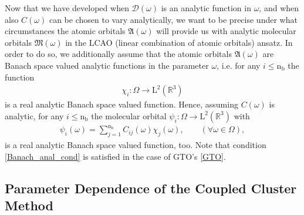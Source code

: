 \documentclass[reqno]{amsart}
\begin{document}
\newline
Now that we have developed when $\mathscr{D}(\omega)$ is an analytic function in $\omega$, and when also $C(\omega)$ can be chosen to vary analytically, we want to be precise under what circumstances the atomic orbitals $\mathfrak{A}(\omega)$ will provide us with analytic molecular orbitals $\mathfrak{M}(\omega)$ in the LCAO (linear combination of atomic orbitals) ansatz. In order to do so, we additionally assume that the atomic orbitals $\mathfrak{A}(\omega)$ are Banach space valued analytic functions in the parameter $\omega$, i.e. for any $i\le \text{n}_\text{b}$ the function
\begin{align}\label{Banach_anal_cond}
    \chi_i:\Omega\longrightarrow \mathrm{L}^2(\mathbb{R}^3)
\end{align}
is a real analytic Banach space valued function. Hence, assuming $C(\omega)$ is analytic, for any $i\le \text{n}_\text{b}$ the molecular orbital $\psi_i:\Omega\longrightarrow\mathrm{L}^2(\mathbb{R}^3)$ with
\begin{align}
    \psi_i(\omega)=\sum_{j=1}^{\text{n}_\text{b}}C_{ij}(\omega)\chi_j(\omega),\qquad (\forall \omega \in \Omega),
\end{align}
is a real analytic Banach space valued function, too. Note that condition \eqref{Banach_anal_cond} is satisfied in the case of GTO's \eqref{GTO}.

\subsection{Parameter Dependence of the Coupled Cluster Method}
\end{document}
